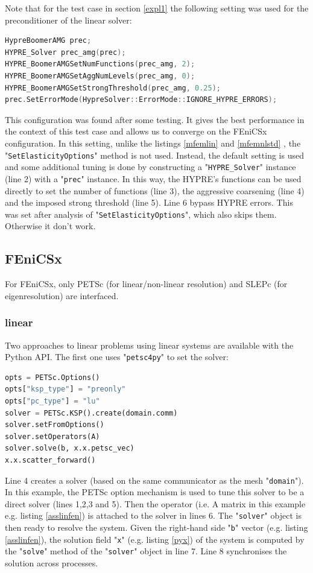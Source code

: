 \documentclass[12pt]{article}
\newcommand{\f}[1]{FEniCSx#1}
\newcommand{\mycode}[1]{\textsf{"}\lstinline`#1`\textsf{"}}
\newcommand{\mycodepy}[1]{\textsf{"}\lstinline[language=Python]`#1`\textsf{"}}
\begin{document}
Note that for the test case in section \ref{expl1} the following setting was used for the preconditioner of the linear solver:
\begin{lstlisting}[basicstyle=\footnotesize,language=c++,label=mfemboomset]	
HypreBoomerAMG prec;
HYPRE_Solver prec_amg(prec);
HYPRE_BoomerAMGSetNumFunctions(prec_amg, 2);
HYPRE_BoomerAMGSetAggNumLevels(prec_amg, 0);
HYPRE_BoomerAMGSetStrongThreshold(prec_amg, 0.25);
prec.SetErrorMode(HypreSolver::ErrorMode::IGNORE_HYPRE_ERRORS);
\end{lstlisting}
This configuration was found after some testing. It gives the best performance in the context of this test case and allows us to converge on the \f{} configuration. 
In this setting, unlike the listings \ref{mfemlin} and \ref{mfemnlstd} , the \mycode{SetElasticityOptions} method is not used.
Instead, the default setting is used and some additional tuning is done by constructing a \mycode{HYPRE_Solver} instance (line 2) with a \mycode{prec} instance.
 In this way, the HYPRE's functions can be used directly to set the number of functions (line 3), the aggressive coarsening (line 4) and the imposed strong threshold (line 5).
 Line 6 bypass HYPRE errors. This was set after analysis of \mycode{SetElasticityOptions}, which also skips them.
 Otherwise it don't work.

\subsection{\f{}}

For \f{}, only PETSc (for linear/non-linear resolution) and SLEPc (for eigenresolution) are interfaced.
\subsubsection{linear}
Two approaches to linear problems using linear systems are available with the Python API.
The first one uses \mycodepy{petsc4py} to set the solver:

\begin{lstlisting}[basicstyle=\footnotesize,language=python,label=fenlinsolverpy]
opts = PETSc.Options()
opts["ksp_type"] = "preonly"
opts["pc_type"] = "lu"
solver = PETSc.KSP().create(domain.comm)
solver.setFromOptions()
solver.setOperators(A)
solver.solve(b, x.x.petsc_vec)
x.x.scatter_forward() 
\end{lstlisting}
Line 4 creates a solver (based on the same communicator as the mesh \mycodepy{domain}).
In this example, the PETSc option mechanism is used to tune this solver to be a direct solver (lines 1,2,3 and 5).  
Then the operator (i.e. A matrix in this example e.g. listing \ref{asslinfen}) is attached to the solver in lines 6. The \mycodepy{solver} object is then ready to resolve the system.
Given the right-hand side \mycodepy{b} vector (e.g. listing \ref{asslinfen}), the solution field \mycodepy{x} (e.g. listing \ref{pyx}) of the system is computed by the \mycodepy{solve} method of the \mycodepy{solver} object in line 7.
Line 8 synchronises the solution across processes.
 
\end{document}
